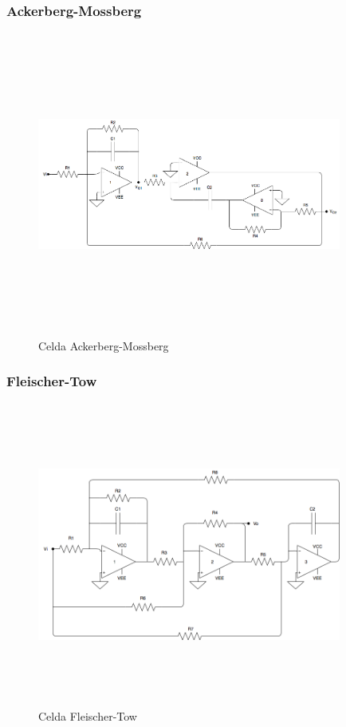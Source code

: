 \subsubsection{Ackerberg-Mossberg}

\begin{figure}[H] %
	\centering
	\includegraphics[width=10cm,height=10cm,keepaspectratio]{../EJ4/ackerberg.png}
	\caption{Celda Ackerberg-Mossberg}
	\label{ackerberg}
\end{figure}

\subsubsection{Fleischer-Tow}

\begin{figure}[H] %
	\centering
	\includegraphics[width=10cm,height=10cm,keepaspectratio]{../EJ4/fleischer.png}
	\caption{Celda Fleischer-Tow}
	\label{fleischer}
\end{figure}